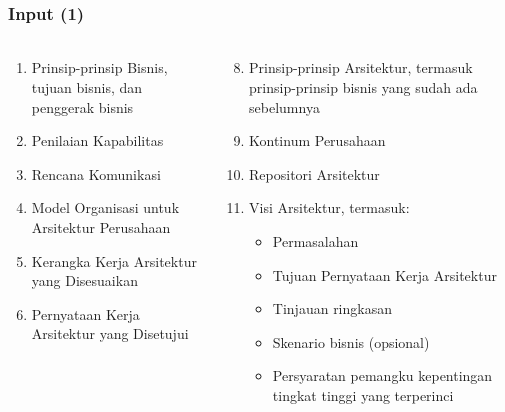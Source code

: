 \documentclass[aspectratio=169, table]{beamer}
\begin{document}
	\begin{frame}
		\frametitle{Input (1)}
		\framesubtitle{\hspace{1cm}}
		\begin{columns}
			\begin{column}{0.5\textwidth}
				\begin{center}
					\begin{enumerate}
					
						\item Prinsip-prinsip Bisnis, tujuan bisnis, dan penggerak bisnis
						\item Penilaian Kapabilitas
						\item Rencana Komunikasi
						\item Model Organisasi untuk Arsitektur Perusahaan
						\item Kerangka Kerja Arsitektur yang Disesuaikan
						\item Pernyataan Kerja Arsitektur yang Disetujui
						
					\end{enumerate}
				\end{center}
			\end{column}
			\begin{column}{0.5\textwidth}
				\begin{center}
					\begin{enumerate}
						\setcounter{enumi}{7}
						\item Prinsip-prinsip Arsitektur, termasuk prinsip-prinsip bisnis yang sudah ada sebelumnya
						\item Kontinum Perusahaan
						\item Repositori Arsitektur
						\item Visi Arsitektur, termasuk:
						\begin{itemize}
							\item Permasalahan
							\item Tujuan Pernyataan Kerja Arsitektur
							\item Tinjauan ringkasan
							\item Skenario bisnis (opsional)
							\item Persyaratan pemangku kepentingan tingkat tinggi yang terperinci
						\end{itemize}
						
					\end{enumerate}
				\end{center}
			\end{column}
		\end{columns}
	\end{frame}
	
\end{document}
